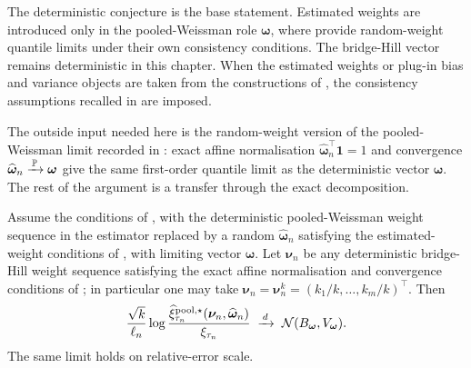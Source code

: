 The deterministic conjecture is the base statement. Estimated weights are
introduced only in the pooled-Weissman role \(\bm\omega\), where
\textcite[Supplementary Material, Theorem~A.1; Theorem~2 and Corollary~8]{DaouiaPadoanStupfler2021}
provide random-weight quantile limits under their own consistency conditions.
The bridge-Hill vector remains deterministic in this chapter.
When the estimated weights or plug-in bias and variance objects are taken from
the constructions of
\textcite[\S2.2 and Corollary~1; Corollaries~6--7]{DaouiaPadoanStupfler2021},
the consistency assumptions recalled in  are
imposed.

The outside input needed here is the random-weight version of the
pooled-Weissman limit recorded in :
exact affine normalisation \(\widehat{\bm\omega}_n^\top\bm 1=1\) and
convergence \(\widehat{\bm\omega}_n\xrightarrow{\,\operatorname{\mathbb{P}}\,}\bm\omega\) give the same
first-order quantile limit as the deterministic vector \(\bm\omega\). The rest
of the argument is a transfer through the exact decomposition.

\begin{conjecture}
\label{conj:pool-ext:estimated-omega}
Assume the conditions of , with the
deterministic pooled-Weissman weight sequence in the estimator replaced by a
random \(\widehat{\bm\omega}_n\) satisfying the estimated-weight conditions of
, with limiting vector
\(\bm\omega\). Let \(\bm\nu_n\) be any deterministic bridge-Hill weight
sequence satisfying the exact affine normalisation and convergence conditions
of ; in particular one may take
\(\bm\nu_n=\bm\nu_n^k=(k_1/k,\ldots,k_m/k)^\top\). Then
\[
  \frac{\sqrt{k}}{\ell_n}
  \log
  \frac{
    \widehat\xi_{\tau_n}^{\mathrm{pool},\star}
    (\bm\nu_n,\widehat{\bm\omega}_n)
  }{\xi_{\tau_n}}
  \;\xrightarrow{\,d\,}\;
  \mathcal N(B_{\bm\omega},V_{\bm\omega}).
\]
The same limit holds on relative-error scale.
\end{conjecture}

